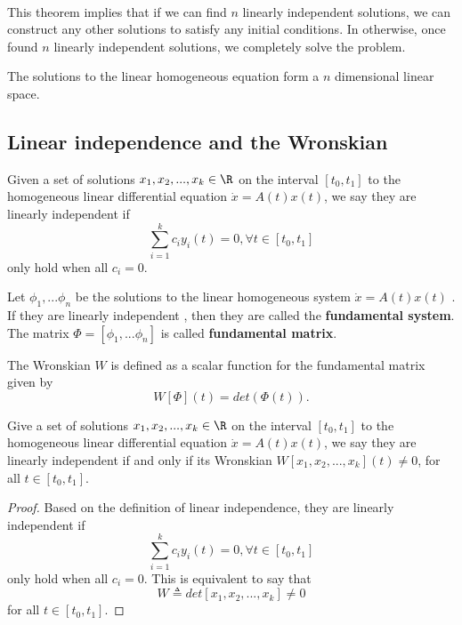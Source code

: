 \begin{refsection}
\begin{remark}[implications]\hfill \\
This theorem implies that if we can find $n$ linearly independent solutions, we can construct any other solutions to satisfy any initial conditions. In otherwise, once found $n$ linearly independent solutions, we completely solve the problem.
\end{remark}

\begin{corollary}
The solutions to the linear homogeneous equation form a $n$ dimensional linear space.
\end{corollary}


\subsection{Linear independence and the Wronskian}

\begin{definition}\cite[40]{luenberger1979introduction}
	Given a set of solutions $x_1,x_2,...,x_k \in \R$ on the interval $[t_0,t_1]$  to the homogeneous linear differential equation $\dot{x}= A(t)x(t)$, we say they are linearly independent if
	$$\sum_{i=1}^k c_i y_i(t) = 0, \forall t\in[t_0,t_1]$$
	only hold when all $c_i = 0$. 
\end{definition}

\begin{definition}\label{ch:dynamical-systems:def:fundamentalmatrix}
Let $\phi_1,...\phi_n$ be the solutions to the linear homogeneous system $\dot{x}= A(t)x(t)$ . If they are linearly independent , then they are called the \textbf{fundamental system}. The matrix $\Phi=[\phi_1,...\phi_n]$ is called \textbf{fundamental matrix}.
\end{definition}



\begin{definition}
\cite[22]{sanchez1968ordinary}The Wronskian $W$ is defined as a scalar function for the fundamental matrix given by
$$W[\Phi](t) = det(\Phi(t)).$$
\end{definition}

\begin{lemma}
Give  a set of solutions $x_1,x_2,...,x_k \in \R$ on the interval $[t_0,t_1]$  to the homogeneous linear differential equation $\dot{x}= A(t)x(t)$, we say they are linearly independent if and only if
its Wronskian $W[x_1,x_2,...,x_k](t)\neq 0$, for all $t\in[t_0,t_1]$.
\end{lemma}
\begin{proof}
Based on the definition of linear independence, they are linearly independent if
$$\sum_{i=1}^k c_i y_i(t) = 0, \forall t\in[t_0,t_1]$$
only hold when all $c_i = 0$. This is equivalent to say that 
$$W\triangleq det [x_1,x_2,...,x_k] \neq 0$$
for all $t\in[t_0,t_1]$.
\end{proof}


\end{refsection}
